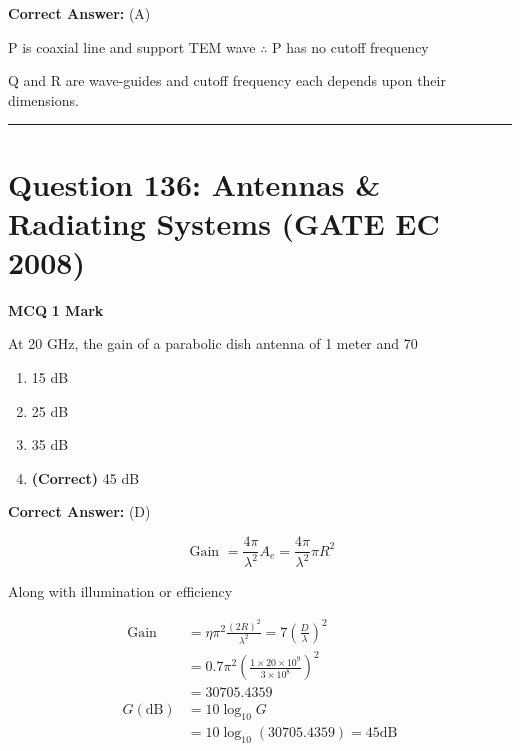 \documentclass[11pt,a4paper]{article}
\begin{document}
\noindent \textbf{Correct Answer:} (A)

\begin{tcolorbox}[solbox, title=Detailed Solution -- Question 135]
P is coaxial line and support TEM wave
$\therefore$  P has no cutoff frequency

Q and R are wave-guides and cutoff frequency
each depends upon their dimensions.
\end{tcolorbox}

\vspace{1.5em}
\hrule
\vspace{1.5em}

\section*{Question 136: Antennas \& Radiating Systems (GATE EC 2008)}
\noindent \textbf{\color{primary}MCQ} \hfill \textbf{\color{secondary}1 Mark}


\noindent At 20 GHz, the gain of a parabolic dish antenna of 1 meter and 70%


\begin{enumerate}[label=(\Alph*)]
    \item 15 dB
    \item 25 dB
    \item 35 dB
    \item \textbf{(Correct)} 45 dB
\end{enumerate}

\noindent \textbf{Correct Answer:} (D)

\begin{tcolorbox}[solbox, title=Detailed Solution -- Question 136]
\[
\text { Gain }=\frac{4 \pi}{\lambda^{2}} A_{e}=\frac{4 \pi}{\lambda^{2}} \pi R^{2}
\]

 Along with illumination or efficiency

\[
\begin{aligned} \text { Gain } &=\eta \pi^{2} \frac{(2 R)^{2}}{\lambda^{2}}=7\left(\frac{D}{\lambda}\right)^{2} \\ &=0.7 \pi^{2}\left(\frac{1 \times 20 \times 10^{9}}{3 \times 10^{8}}\right)^{2} \\ &=30705.4359 \\ G(\mathrm{dB}) &=10 \log _{10} G \\ &=10 \log _{10}(30705.4359)=45 \mathrm{dB} \end{aligned}
\]
\end{tcolorbox}
\end{document}
